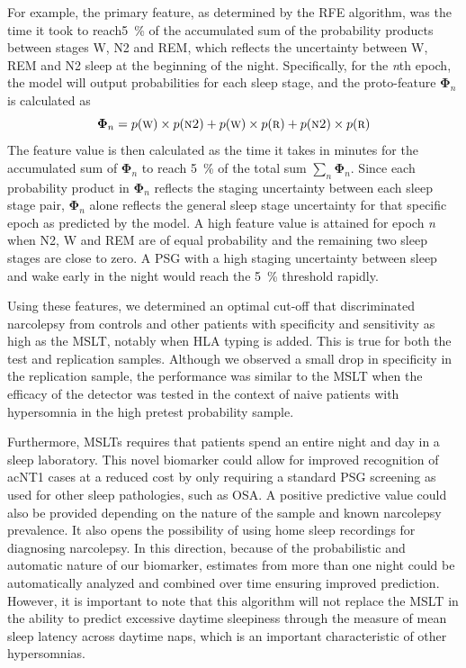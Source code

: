 For example, the primary feature, as determined by the \ac{RFE} algorithm, was the time it took to reach\SI{5}{\percent} of the accumulated sum of the probability products between stages \ac{W}, \ac{N2} and \ac{REM}, which reflects the uncertainty between \ac{W}, \ac{REM} and \ac{N2} sleep at the beginning of the night. 
Specifically, for the \textit{n}th epoch, the model will output probabilities for each sleep stage, and the proto-feature \( \boldsymbol{\Phi}_n \) is calculated as
\begin{equation}
    \boldsymbol{\Phi}_n = \func{p}{\wake} \times \func{p}{\nII} + \func{p}{\wake} \times \func{p}{\rem} + \func{p}{\nII} \times \func{p}{\rem}
\end{equation}
The feature value is then calculated as the time it takes in minutes for the accumulated sum of \( \boldsymbol{\Phi}_n \) to reach \SI{5}{\percent} of the total sum \( \sum_n \boldsymbol{\Phi}_n \). 
Since each probability product in \( \boldsymbol{\Phi}_n \) reflects the staging uncertainty between each sleep stage pair, \( \boldsymbol{\Phi}_n \) alone reflects the general sleep stage uncertainty for that specific epoch as predicted by the model. 
A high feature value is attained for epoch \textit{n} when \ac{N2}, \ac{W} and \ac{REM} are of equal probability and the remaining two sleep stages are close to zero. 
A \ac{PSG} with a high staging uncertainty between sleep and wake early in the night would reach the \SI{5}{\percent} threshold rapidly.

Using these features, we determined an optimal cut-off that discriminated narcolepsy from controls and other patients with specificity and sensitivity as high as the \ac{MSLT}, notably when \ac{HLA} typing is added. 
This is true for both the test and replication samples. 
Although we observed a small drop in specificity in the replication sample, the performance was similar to the \ac{MSLT} when the efficacy of the detector was tested in the context of naive patients with hypersomnia in the high pretest probability sample.

Furthermore, \acp{MSLT} requires that patients spend an entire night and day in a sleep laboratory. 
This novel biomarker could allow for improved recognition of ac{NT1} cases at a reduced cost by only requiring a standard \ac{PSG} screening as used for other sleep pathologies, such as \ac{OSA}.
A positive predictive value could also be provided depending on the nature of the sample and known narcolepsy prevalence.
It also opens the possibility of using home sleep recordings for diagnosing narcolepsy. 
In this direction, because of the probabilistic and automatic nature of our biomarker, estimates from more than one night could be automatically analyzed and combined over time ensuring improved prediction. 
However, it is important to note that this algorithm will not replace the \ac{MSLT} in the ability to predict excessive daytime sleepiness through the measure of mean sleep latency across daytime naps, which is an important characteristic of other hypersomnias.

